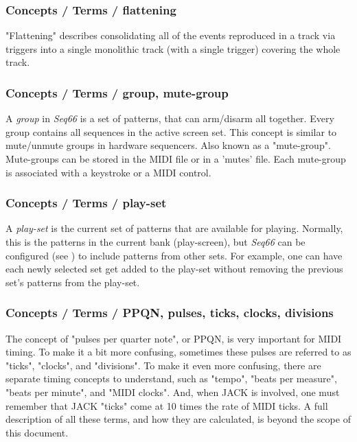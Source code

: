 \subsubsection{Concepts / Terms / flattening}
\label{subsubsec:concepts_terms_flattening}

   "Flattening" describes consolidating all of the events reproduced in a track
   via triggers into a single monolithic track (with a single trigger) covering
   the whole track.

\subsubsection{Concepts / Terms / group, mute-group}
\label{subsubsec:concepts_terms_group}

   A \textsl{group} in \textsl{Seq66} is a
   set of patterns, that can arm/disarm all together.
   Every group contains all sequences in the active screen set. 
   This concept is similar to mute/unmute groups in hardware
   sequencers.
   Also known as a "mute-group".
   Mute-groups can be stored in the MIDI file or in a 'mutes' file.
   Each mute-group is associated with a keystroke or a MIDI control.

\subsubsection{Concepts / Terms / play-set}
\label{subsubsec:concepts_terms_playset}

   A \textsl{play-set} is the current set of patterns that are available for
   playing.  Normally, this is the patterns in the current bank (play-screen),
   but \textsl{Seq66} can be configured
   (see )
   to include patterns from other sets.
   For example, one can have each newly selected set get added to the play-set
   without removing the previous set's patterns from the play-set.

\subsubsection{Concepts / Terms / PPQN, pulses, ticks, clocks, divisions}
\label{subsubsec:concepts_terms_pulses}

   The concept of "pulses per quarter note", or PPQN, is very important for
   MIDI timing.  To make it a bit more confusing, sometimes these pulses are
   referred to as "ticks", "clocks", and "divisions".
   To make it even more confusing, there are separate timing concepts to
   understand, such as "tempo", "beats per measure", "beats per minute", and
   "MIDI clocks".
   And, when JACK is involved, one must remember that JACK "ticks" come at 10
   times the rate of MIDI ticks.
   A full description of all these terms, and how they are calculated, is
   beyond the scope of this document.

